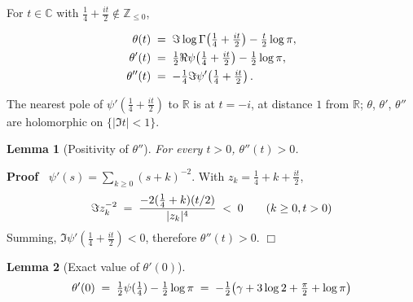 \documentclass{article}
\newcommand{\nin}{\not\in}
\newenvironment{proof}{\noindent\textbf{Proof\ }}{\hspace*{\fill}$\Box$\medskip}
\newtheorem{lemma}{Lemma}
\begin{document}
For $t \in \mathbb{C}$ with $\tfrac{1}{4} + \tfrac{it}{2} \nin \mathbb{Z}_{\le
0}$,

\begin{align}
  \theta (t) & \hspace{0.27em} = \hspace{0.27em} \Im \log \Gamma
  \hspace{-0.17em} \left( \tfrac{1}{4} + \tfrac{it}{2} \right) - \tfrac{t}{2}
  \log \pi,  \label{eq:theta}\\
  \theta' (t) & \hspace{0.27em} = \hspace{0.27em} \tfrac{1}{2} \Re \psi
  \hspace{-0.17em} \left( \tfrac{1}{4} + \tfrac{it}{2} \right) - \tfrac{1}{2}
  \log \pi,  \label{eq:thetap}\\
  \theta'' (t) & \hspace{0.27em} = \hspace{0.27em} - \tfrac{1}{4} \Im \psi' 
  \hspace{-0.17em} \left( \tfrac{1}{4} + \tfrac{it}{2} \right) . 
  \label{eq:thetapp}
\end{align}

The nearest pole of $\psi'  (\tfrac{1}{4} + \tfrac{it}{2})$ to $\mathbb{R}$ is
at $t = - i$, at distance $1$ from $\mathbb{R}$; $\theta$, $\theta'$,
$\theta''$ are holomorphic on $\{| \Im t| < 1\}$.

\begin{lemma}
  [Positivity of $\theta''$]\label{lem:thetapp} For every $t > 0$, $\theta''
  (t) > 0$.
\end{lemma}

\begin{proof}
  $\psi' (s) = \sum_{k \ge 0} (s + k)^{- 2}$. With $z_k = \tfrac{1}{4} + k +
  \tfrac{it}{2}$,
  \begin{equation}
    \Im z_k^{- 2} \hspace{0.27em} = \hspace{0.27em} \frac{- 2 (\tfrac{1}{4} +
    k)  (t / 2)}{|z_k |^4} \hspace{0.27em} < \hspace{0.27em} 0 \qquad (k \ge
    0, t > 0)
  \end{equation}
  Summing, $\Im \psi'  (\tfrac{1}{4} + \tfrac{it}{2}) < 0$, therefore
  $\theta'' (t) > 0$.
\end{proof}

\begin{lemma}
  [Exact value of $\theta' (0)$]\label{lem:thetaprime0}
  \begin{equation}
    \theta' (0) \hspace{0.27em} = \hspace{0.27em} \tfrac{1}{2} \psi
    (\tfrac{1}{4}) - \tfrac{1}{2} \log \pi \hspace{0.27em} = \hspace{0.27em} -
    \tfrac{1}{2} \hspace{-0.17em} \left( \gamma + 3 \log 2 + \tfrac{\pi}{2} +
    \log \pi \right)
  \end{equation}
\end{lemma}
\end{document}
